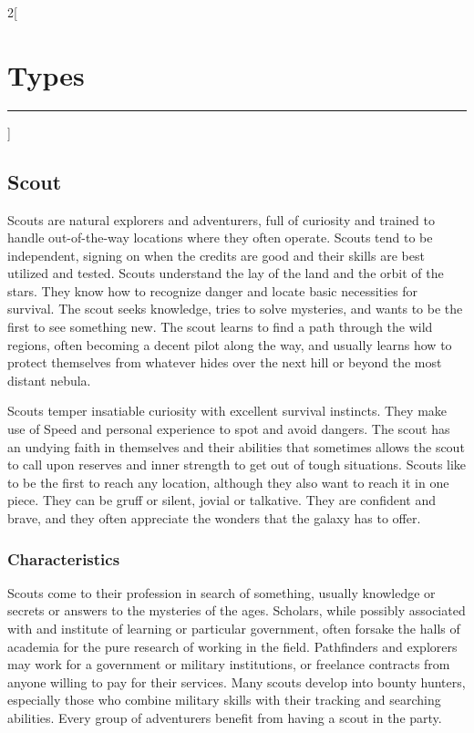 \documentclass[a4paper,10pt,final]{book}
\newcommand{\HRule}{\rule{\linewidth}{0.5mm}} %
\newcommand{\newSection}[1]{\section*{#1} \addcontentsline{toc}{section}{#1} \label{sec:#1} \HRule}
\newenvironment{docsection}[1]
{
  \begin{multicols*}{2}[\newSection{#1}]
}
{
  \end{multicols*}
  \newpage
}
\begin{document}
\begin{docsection}{Types}
\subsection*{Scout} %
\label{sub:scout}
Scouts are natural explorers and adventurers, full of curiosity and trained to handle out-of-the-way locations where they often operate. Scouts tend to be independent, signing on when the credits are good and their skills are best utilized and tested. Scouts understand the lay of the land and the orbit of the stars. They know how to recognize danger and locate basic necessities for survival. The scout seeks knowledge, tries to solve mysteries, and wants to be the first to see something new. The scout learns to find a path through the wild regions, often becoming a decent pilot along the way, and usually learns how to protect themselves from whatever hides over the next hill or beyond the most distant nebula. \par

Scouts temper insatiable curiosity with excellent survival instincts. They make use of Speed and personal experience to spot and avoid dangers. The scout has an undying faith in themselves and their abilities that sometimes allows the scout to call upon reserves and inner strength to get out of tough situations. Scouts like to be the first to reach any location, although they also want to reach it in one piece. They can be gruff or silent, jovial or talkative. They are confident and brave, and they often appreciate the wonders that the galaxy has to offer.

\subsubsection*{Characteristics}
\label{subsub:scoutCharacteristics}
Scouts come to their profession in search of something, usually knowledge or secrets or answers to the mysteries of the ages. Scholars, while possibly associated with and institute of learning or particular government, often forsake the halls of academia for the pure research of working in the field. Pathfinders and explorers may work for a government or military institutions, or freelance contracts from anyone willing to pay for their services. Many scouts develop into bounty hunters, especially those who combine military skills with their tracking and searching abilities. Every group of adventurers benefit from having a scout in the party.\par


\end{docsection}
\end{document}
